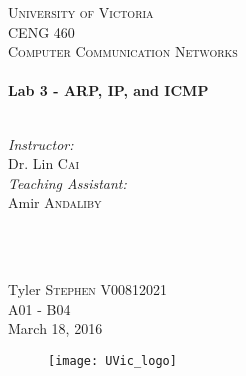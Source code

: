 \begin{titlepage}

\center
 
\textsc{\LARGE University of Victoria}\\[1cm] 	%
\textsc{\Large CENG 460}\\[0.5cm] 			%
\textsc{\large Computer Communication Networks}\\[0.5cm] 		%


\HRule \\[0.4cm]
{\huge \bfseries Lab 3 - ARP, IP, and ICMP}\\[0.2cm] %
\HRule \\[1.5cm]
 
 
\begin{minipage}{0.7\textwidth}
\begin{flushleft} 

\large\emph{Instructor:} \\
Dr. Lin \textsc{Cai} \\
\vspace{12 pt}
\emph{Teaching Assistant:} \\
Amir \textsc{Andaliby}

\end{flushleft}
\end{minipage}
~
\begin{minipage}{0.1\textwidth}
\begin{flushright} \large

\vspace{12 pt}

\end{flushright}
\end{minipage}\\[2cm]


\Large Tyler \textsc{Stephen}
\large V00812021	\\
A01 - B04\\[1.5cm] 


{\large March 18, 2016}\\ %

\begin{figure}[b]	 %
	\centering
	\texttt{[image: UVic\_logo]}
\end{figure}

\end{titlepage}

